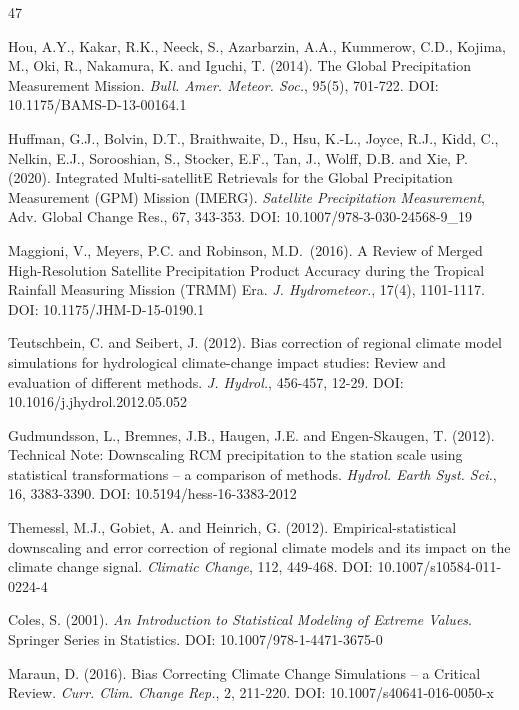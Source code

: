 \documentclass[11pt,a4paper]{article}
\begin{document}


\begin{thebibliography}{47}


 Hou, A.Y., Kakar, R.K., Neeck, S., Azarbarzin, A.A., Kummerow,
C.D., Kojima, M., Oki, R., Nakamura, K. and Iguchi, T. (2014). The
Global Precipitation Measurement Mission. \emph{Bull. Amer. Meteor.
Soc.}, 95(5), 701-722. DOI: 10.1175/BAMS-D-13-00164.1

 Huffman, G.J., Bolvin, D.T., Braithwaite, D., Hsu, K.-L., Joyce,
R.J., Kidd, C., Nelkin, E.J., Sorooshian, S., Stocker, E.F., Tan, J.,
Wolff, D.B. and Xie, P. (2020). Integrated Multi-satellitE Retrievals
for the Global Precipitation Measurement (GPM) Mission (IMERG).
\emph{Satellite Precipitation Measurement}, Adv. Global Change Res., 67,
343-353. DOI: 10.1007/978-3-030-24568-9\_19

 Maggioni, V., Meyers, P.C. and Robinson, M.D.~(2016). A Review
of Merged High-Resolution Satellite Precipitation Product Accuracy
during the Tropical Rainfall Measuring Mission (TRMM) Era. \emph{J.
Hydrometeor.}, 17(4), 1101-1117. DOI: 10.1175/JHM-D-15-0190.1

 Teutschbein, C. and Seibert, J. (2012). Bias correction of
regional climate model simulations for hydrological climate-change
impact studies: Review and evaluation of different methods. \emph{J.
Hydrol.}, 456-457, 12-29. DOI: 10.1016/j.jhydrol.2012.05.052

 Gudmundsson, L., Bremnes, J.B., Haugen, J.E. and Engen-Skaugen,
T. (2012). Technical Note: Downscaling RCM precipitation to the station
scale using statistical transformations -- a comparison of methods.
\emph{Hydrol. Earth Syst. Sci.}, 16, 3383-3390. DOI:
10.5194/hess-16-3383-2012

 Themessl, M.J., Gobiet, A. and Heinrich, G. (2012).
Empirical-statistical downscaling and error correction of regional
climate models and its impact on the climate change signal.
\emph{Climatic Change}, 112, 449-468. DOI: 10.1007/s10584-011-0224-4

 Coles, S. (2001). \emph{An Introduction to Statistical Modeling
of Extreme Values}. Springer Series in Statistics. DOI:
10.1007/978-1-4471-3675-0

 Maraun, D. (2016). Bias Correcting Climate Change Simulations --
a Critical Review. \emph{Curr. Clim. Change Rep.}, 2, 211-220. DOI:
10.1007/s40641-016-0050-x


\end{thebibliography}
\end{document}
